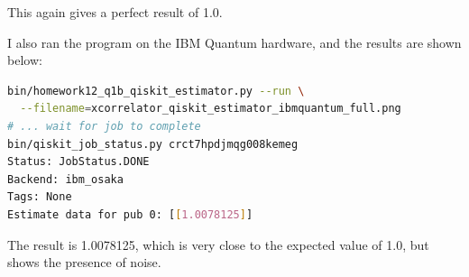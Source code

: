 \documentclass[12pt]{extarticle}
\begin{document}
\begin{enumerate}[(a)]
This again gives a perfect result of 1.0.

I also ran the program on the IBM Quantum hardware, and the results are shown below:
\begin{lstlisting}[language=bash]
bin/homework12_q1b_qiskit_estimator.py --run \
  --filename=xcorrelator_qiskit_estimator_ibmquantum_full.png
# ... wait for job to complete
bin/qiskit_job_status.py crct7hpdjmqg008kemeg
Status: JobStatus.DONE
Backend: ibm_osaka
Tags: None
Estimate data for pub 0: [[1.0078125]]
\end{lstlisting}

The result is 1.0078125, which is very close to the expected value of 1.0, but shows the presence of noise.

\end{enumerate}

\end{document}
